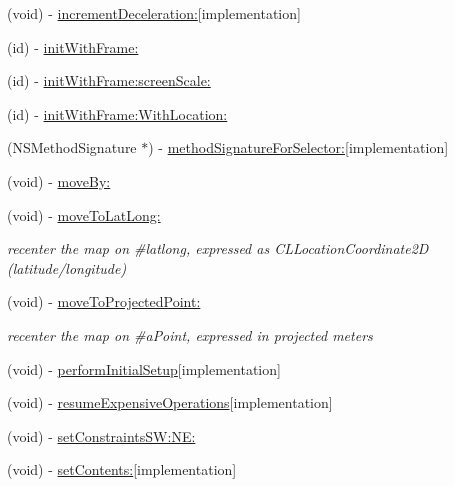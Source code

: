 \begin{DoxyCompactItemize}
\item 
(void) -\/ \hyperlink{interface_r_m_map_view_a1437dbaa8dbeb7dd1c39e64af6fe67e9}{increment\-Deceleration\-:}{\ttfamily  \mbox{[}implementation\mbox{]}}
\item 
(id) -\/ \hyperlink{interface_r_m_map_view_a71b21d934e08438432276751ae143724}{init\-With\-Frame\-:}
\item 
(id) -\/ \hyperlink{interface_r_m_map_view_a0f9e140d1265f696965fa73730fdf7e3}{init\-With\-Frame\-:screen\-Scale\-:}
\item 
(id) -\/ \hyperlink{interface_r_m_map_view_adcd80394c57cbe77208bfc6726ff94dd}{init\-With\-Frame\-:\-With\-Location\-:}
\item 
(N\-S\-Method\-Signature $\ast$) -\/ \hyperlink{interface_r_m_map_view_ab97fa7e84b093b0e309ffe18cec6ffad}{method\-Signature\-For\-Selector\-:}{\ttfamily  \mbox{[}implementation\mbox{]}}
\item 
(void) -\/ \hyperlink{interface_r_m_map_view_a27baf3f4a31aca87ce9f1a54437b1af0}{move\-By\-:}
\item 
(void) -\/ \hyperlink{interface_r_m_map_view_a1097238683168693264f3f1fd0e69f80}{move\-To\-Lat\-Long\-:}
\begin{DoxyCompactList}\small\item\em recenter the map on \#latlong, expressed as C\-L\-Location\-Coordinate2\-D (latitude/longitude) \end{DoxyCompactList}\item 
(void) -\/ \hyperlink{interface_r_m_map_view_a7a576fb939de0ccc3e50f5f92ef9718d}{move\-To\-Projected\-Point\-:}
\begin{DoxyCompactList}\small\item\em recenter the map on \#a\-Point, expressed in projected meters \end{DoxyCompactList}\item 
(void) -\/ \hyperlink{interface_r_m_map_view_a8eef4d40f5482cf90fe43a8e98f5dba8}{perform\-Initial\-Setup}{\ttfamily  \mbox{[}implementation\mbox{]}}
\item 
(void) -\/ \hyperlink{interface_r_m_map_view_acb8af34cf5b0de81f4643bdcb19c0a59}{resume\-Expensive\-Operations}{\ttfamily  \mbox{[}implementation\mbox{]}}
\item 
(void) -\/ \hyperlink{interface_r_m_map_view_ac72f6a4091d84d904b65b303fac6bd25}{set\-Constraints\-S\-W\-:\-N\-E\-:}
\item 
(void) -\/ \hyperlink{interface_r_m_map_view_a489d7ac50d1ac7c2629db80141e7f8a6}{set\-Contents\-:}{\ttfamily  \mbox{[}implementation\mbox{]}}

\end{DoxyCompactItemize}
